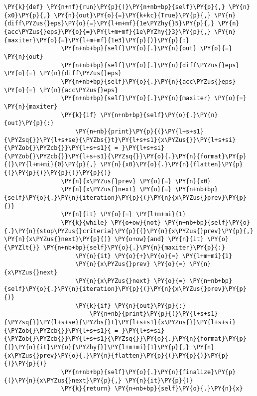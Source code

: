 \begin{Verbatim}[commandchars=\\\{\}]
            \PY{k}{def} \PY{n+nf}{run}\PY{p}{(}\PY{n+nb+bp}{self}\PY{p}{,} \PY{n}{x0}\PY{p}{,} \PY{n}{out}\PY{o}{=}\PY{k+kc}{True}\PY{p}{,} \PY{n}{diff\PYZus{}eps}\PY{o}{=}\PY{l+m+mf}{1e\PYZhy{}5}\PY{p}{,} \PY{n}{acc\PYZus{}eps}\PY{o}{=}\PY{l+m+mf}{1e\PYZhy{}3}\PY{p}{,} \PY{n}{maxiter}\PY{o}{=}\PY{l+m+mf}{1e3}\PY{p}{)}\PY{p}{:}
                \PY{n+nb+bp}{self}\PY{o}{.}\PY{n}{out} \PY{o}{=} \PY{n}{out}
                \PY{n+nb+bp}{self}\PY{o}{.}\PY{n}{diff\PYZus{}eps} \PY{o}{=} \PY{n}{diff\PYZus{}eps}
                \PY{n+nb+bp}{self}\PY{o}{.}\PY{n}{acc\PYZus{}eps} \PY{o}{=} \PY{n}{acc\PYZus{}eps}
                \PY{n+nb+bp}{self}\PY{o}{.}\PY{n}{maxiter} \PY{o}{=} \PY{n}{maxiter}
                \PY{k}{if} \PY{n+nb+bp}{self}\PY{o}{.}\PY{n}{out}\PY{p}{:}
                    \PY{n+nb}{print}\PY{p}{(}\PY{l+s+s1}{\PYZsq{}}\PY{l+s+se}{\PYZbs{}t}\PY{l+s+s1}{x\PYZus{}}\PY{l+s+si}{\PYZob{}\PYZcb{}}\PY{l+s+s1}{ = }\PY{l+s+si}{\PYZob{}\PYZcb{}}\PY{l+s+s1}{\PYZsq{}}\PY{o}{.}\PY{n}{format}\PY{p}{(}\PY{l+m+mi}{0}\PY{p}{,} \PY{n}{x0}\PY{o}{.}\PY{n}{flatten}\PY{p}{(}\PY{p}{)}\PY{p}{)}\PY{p}{)}
                \PY{n}{x\PYZus{}prev} \PY{o}{=} \PY{n}{x0}
                \PY{n}{x\PYZus{}next} \PY{o}{=} \PY{n+nb+bp}{self}\PY{o}{.}\PY{n}{iteration}\PY{p}{(}\PY{n}{x\PYZus{}prev}\PY{p}{)}
                \PY{n}{it} \PY{o}{=} \PY{l+m+mi}{1}
                \PY{k}{while} \PY{o+ow}{not} \PY{n+nb+bp}{self}\PY{o}{.}\PY{n}{stop\PYZus{}criteria}\PY{p}{(}\PY{n}{x\PYZus{}prev}\PY{p}{,} \PY{n}{x\PYZus{}next}\PY{p}{)} \PY{o+ow}{and} \PY{n}{it} \PY{o}{\PYZlt{}} \PY{n+nb+bp}{self}\PY{o}{.}\PY{n}{maxiter}\PY{p}{:}
                    \PY{n}{it} \PY{o}{+}\PY{o}{=} \PY{l+m+mi}{1}
                    \PY{n}{x\PYZus{}prev} \PY{o}{=} \PY{n}{x\PYZus{}next}
                    \PY{n}{x\PYZus{}next} \PY{o}{=} \PY{n+nb+bp}{self}\PY{o}{.}\PY{n}{iteration}\PY{p}{(}\PY{n}{x\PYZus{}prev}\PY{p}{)}
                    \PY{k}{if} \PY{n}{out}\PY{p}{:}
                        \PY{n+nb}{print}\PY{p}{(}\PY{l+s+s1}{\PYZsq{}}\PY{l+s+se}{\PYZbs{}t}\PY{l+s+s1}{x\PYZus{}}\PY{l+s+si}{\PYZob{}\PYZcb{}}\PY{l+s+s1}{ = }\PY{l+s+si}{\PYZob{}\PYZcb{}}\PY{l+s+s1}{\PYZsq{}}\PY{o}{.}\PY{n}{format}\PY{p}{(}\PY{n}{it}\PY{o}{\PYZhy{}}\PY{l+m+mi}{1}\PY{p}{,} \PY{n}{x\PYZus{}prev}\PY{o}{.}\PY{n}{flatten}\PY{p}{(}\PY{p}{)}\PY{p}{)}\PY{p}{)}
                \PY{n+nb+bp}{self}\PY{o}{.}\PY{n}{finalize}\PY{p}{(}\PY{n}{x\PYZus{}next}\PY{p}{,} \PY{n}{it}\PY{p}{)}
                \PY{k}{return} \PY{n+nb+bp}{self}\PY{o}{.}\PY{n}{x}
            

\end{Verbatim}
